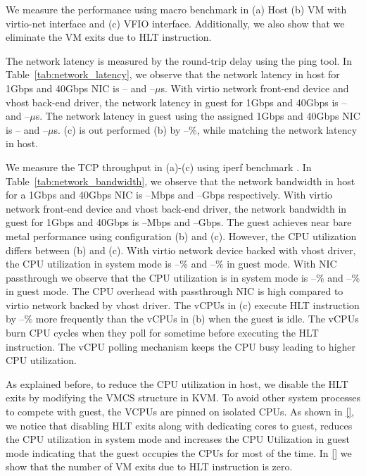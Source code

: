 We measure the performance using macro benchmark in (a) Host
(b) VM with virtio-net interface and (c) VFIO interface.
Additionally, we also show that we eliminate the VM exits due
to HLT instruction.

The network latency is measured by the round-trip delay using
the ping tool. In Table~\ref{tab:network_latency}, we observe
that the network latency in host for 1Gbps and 40Gbps NIC is
-- and --$\mu$s. With virtio network front-end device and
vhost back-end driver, the network latency in guest for 1Gbps
and 40Gbps is -- and --$\mu$s. The network latency in guest
using the assigned 1Gbps and 40Gbps NIC is -- and --$\mu$s.
(c) is out performed (b) by --\%, while matching the network
latency in host.

We measure the TCP throughput in (a)-(c) using iperf benchmark
\cite{iperf}. In Table~\ref{tab:network_bandwidth}, we observe that
the network bandwidth in host for a 1Gbps and 40Gbps NIC is
--Mbps and --Gbps respectively. With virtio network front-end
device and vhost back-end driver, the network bandwidth in
guest for 1Gbps and 40Gbps is --Mbps and --Gbps. The guest
achieves near bare metal performance using configuration (b)
and (c).  However, the CPU utilization differs between (b) and
(c). With virtio network device backed with vhost driver, the
CPU utilization in system mode is --\% and --\% in guest mode.
With NIC passthrough we observe that the CPU utilization is in
system mode is --\% and --\% in guest mode. The CPU overhead
with passthrough NIC is high compared to virtio network backed
by vhost driver. The vCPUs in (c) execute HLT instruction by
--\% more frequently than the vCPUs in (b) when the guest is
idle. The vCPUs burn CPU cycles when they poll for sometime
before executing the HLT instruction. The vCPU polling
mechanism keeps the CPU busy leading to higher CPU
utilization.

As explained before, to reduce the CPU utilization in host, we
disable the HLT exits by modifying the VMCS structure in KVM.
To avoid other system processes to compete with guest, the
VCPUs are pinned on isolated CPUs. As shown in \ref{}, we
notice that disabling HLT exits along with dedicating cores to
guest, reduces the CPU utilization in system mode and
increases the CPU Utilization in guest mode indicating that
the guest occupies the CPUs for most of the time. In \ref{} we
show that the number of VM exits due to HLT instruction is
zero.

